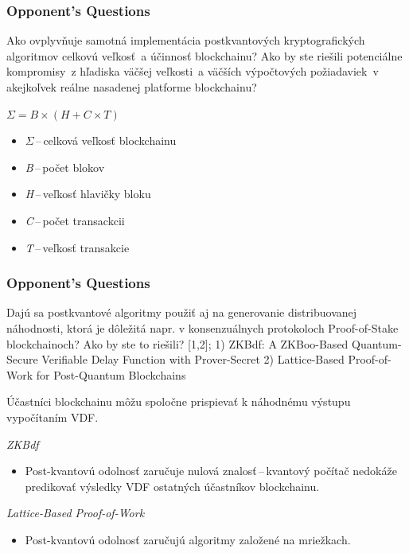
\appendix{}
\begin{frame}
    \frametitle{Opponent's Questions}
    Ako ovplyvňuje samotná implementácia postkvantových kryptografických algoritmov celkovú veľkosť~a účinnosť blockchainu? Ako by ste riešili potenciálne kompromisy~z hľadiska väčšej veľkosti~a väčších výpočtových požiadaviek~v akejkoľvek reálne nasadenej platforme blockchainu?
    
    \bigskip
    
    \begin{center}
        $\Sigma = B \times (H + C \times T)$
    \end{center}

    \begin{itemize}
        \item \emph{$\Sigma$}\,--\,celková veľkosť blockchainu
        \item \emph{B}\,--\,počet blokov
        \item \emph{H}\,--\,veľkosť hlavičky bloku
        \item \emph{C}\,--\,počet transackcii
        \item \emph{T}\,--\,veľkosť transakcie
    \end{itemize}
    
\end{frame}


\begin{frame}
    \frametitle{Opponent's Questions}
    Dajú sa postkvantové algoritmy použiť aj na generovanie distribuovanej náhodnosti, ktorá je dôležitá napr. v konsenzuálnych protokoloch Proof-of-Stake blockchainoch? Ako by ste to riešili? [1,2]; 1) ZKBdf: A ZKBoo-Based Quantum-Secure Verifiable Delay Function with Prover-Secret 2) Lattice-Based Proof-of-Work for Post-Quantum Blockchains

    \bigskip

    Účastníci blockchainu môžu spoločne prispievať k náhodnému výstupu vypočítaním VDF.

    \bigskip

    \emph{ZKBdf}

    \begin{itemize}
        \item Post-kvantovú odolnosť zaručuje nulová znalosť\,--\,kvantový počítač nedokáže predikovať výsledky VDF ostatných účastníkov blockchainu.
    \end{itemize}

    \emph{Lattice-Based Proof-of-Work}

    \begin{itemize}
        \item Post-kvantovú odolnosť zaručujú algoritmy založené na mriežkach.
    \end{itemize}
    
\end{frame}


